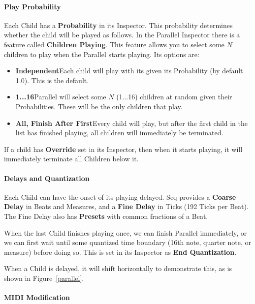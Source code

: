\documentclass[twoside,10pt]{article}
\begin{document}
\paragraph{Play Probability}

Each Child has a {\bf Probability} in its Inspector.  This probability determines whether the child will be played as follows.  In the Parallel Inspector there is a feature called {\bf Children Playing}.  This feature allows you to select some \(N\) children to play when the Parallel starts playing.  Its options are:

\begin{itemize}
\item {\bf Independent}\quad Each child will play with its given its Probability (by default 1.0).  This is the default.
\item {\bf 1...16}\quad Parallel will select some \(N\) (1...16) children at random given their Probabilities.  These will be the only children that play.
\item {\bf All, Finish After First}\quad Every child will play, but after the first child in the list has finished playing, all children will immediately be terminated.
\end{itemize}

If a child has {\bf Override} set in its Inspector, then when it starts playing, it will immediately terminate all Children below it.  

\paragraph{Delays and Quantization}

Each Child can have the onset of its playing delayed.  Seq provides a {\bf Coarse Delay} in Beats and Measures, and a {\bf Fine Delay} in Ticks (192 Ticks per Beat).  The Fine Delay also has {\bf Presets} with common fractions of a Beat.

When the last Child finishes playing once, we can finish Parallel immediately, or we can first wait until some quantized time boundary (16th note, quarter note, or measure) before doing so.  This is set in its Inspector as {\bf End Quantization}.

When a Child is delayed, it will shift horizontally to demonstrate this, as is shown in Figure~\ref{parallel}.


\paragraph{MIDI Modification}
\end{document}
